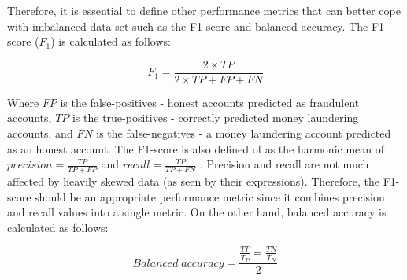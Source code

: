Therefore, it is essential to define other performance metrics that can better cope with imbalanced data set such as the F1-score and balanced accuracy. The F1-score ($F_1$) is calculated as follows:

\begin{equation}
    F_1 = \frac{2 \times TP}{2 \times TP + FP + FN}
\label{ch3_f1_eq}
\end{equation} 

Where $FP$ is the false-positives - honest accounts predicted as fraudulent accounts, $TP$ is the true-positives - correctly predicted money laundering accounts, and $FN$ is the false-negatives - a money laundering account predicted as an honest account. The F1-score is also defined of as the harmonic mean of $precision = \frac{TP}{TP+FP}$ and $recall = \frac{TP}{TP + FN}$ \citep{james2013introduction}. Precision and recall are not much affected by heavily skewed data (as seen by their expressions). Therefore, the F1-score should be an appropriate performance metric since it combines precision and recall values into a single metric. On the other hand, balanced accuracy is calculated as follows:

$$Balanced\;accuracy = \frac{\frac{TP}{T_{P}} = \frac{TN}{T_{N}}}{2} $$

